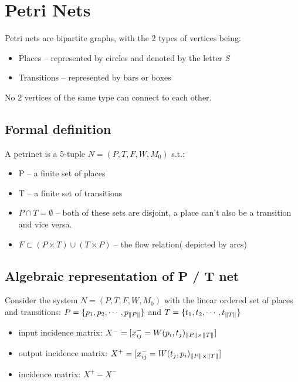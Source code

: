 
\chapter{Petri Nets}
Petri nets are bipartite graphs, with the 2 types of vertices being:
\begin{itemize}
        \item Places -- represented by circles and denoted by the letter \textit{S}
        \item Transitions -- represented by bars or boxes
\end{itemize}
No 2 vertices of the same type can connect to each other.\\
\section{Formal definition}
A petrinet is a 5-tuple $N = (P,T,F,W,M_0)$ s.t.:
\begin{itemize}
    \item P -- a finite set of places
    \item T -- a finite set of transitions
    \item $P \cap T = \emptyset$ -- both of these sets are disjoint, a place can't also be a transition and vice versa.
    \item  $F \subset (P\times T)\cup(T\times P)$ -- the flow relation( depicted by arcs)
\end{itemize}
    
{
}

\section{Algebraic representation of P / T net}
Consider the system $N = (P,T,F,W,M_0)$ with the linear ordered set of places and transitions: $P = \{p_1,p_2,\cdots ,p_{\lVert P\rVert}\}$ and $T = \{t_1,t_2,\cdots ,t_{\lVert T\rVert}\}$
\begin{itemize}
    \item input incidence matrix: $X^{-} = [x^{-}_{ij} = W(p_i,t_j)_{\lVert P\rVert\times\lVert T\rVert}]$
    \item output incidence matrix: $X^{+} = [x^{-}_{ij} = W(t_j,p_i)_{\lVert P\rVert\times\lVert T\rVert}]$
    \item incidence matrix: $X^{+}-X^{-}$
\end{itemize}

